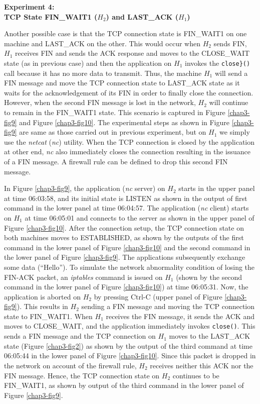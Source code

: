 \begin{multicols}{2}
\noindent
\textbf{Experiment 4:\\ TCP State FIN\_WAIT1 (\boldmath$H_{2}$) and LAST\_ACK ($H_{1}$)}
\smallskip

Another possible case is that the TCP connection state is FIN\_WAIT1 on one machine and LAST\_ACK on the other. This would occur when $H_{2}$ sends FIN, $H_{1}$ receives FIN and sends the ACK response and moves to the CLOSE\_WAIT state (as in previous case) and then the application on $H_{1}$ invokes the \lstinline|close}()| call because it has no more data to transmit. Thus, the machine $H_{1}$ will send a FIN message and move the TCP connection state to LAST\_ACK state as it waits for the acknowledgement of its FIN in order to finally close the connection. However, when the second FIN message is lost in the network, $H_{2}$ will continue to remain in the FIN\_WAIT1 state. This scenario is captured in Figure \ref{chap3-fig9} and Figure \ref{chap3-fig10}. The experimental steps as shown in Figure \ref{chap3-fig9} are same as those carried out in previous experiment, but on $H_{1}$ we simply use the \textit{netcat} (\textit{nc}) utility. When the TCP connection is closed by the application at other end, \textit{nc} also immediately closes the connection resulting in the issuance of a FIN message. A firewall rule can be defined to drop this second FIN message.

In Figure \ref{chap3-fig9}, the application (\textit{nc} server) on $H_{2}$ starts in the upper panel at time 06:03:58, and its initial state is LISTEN as shown in the output of first command in the lower panel at time 06:04:57. The application (\textit{nc} client) starts on $H_{1}$ at time 06:05:01 and connects to the server as shown in the upper panel of Figure \ref{chap3-fig10}. After the connection setup, the TCP connection state on both machines moves to ESTABLISHED, as shown by the outputs of the first command in the lower panel of Figure \ref{chap3-fig10} and the second command in the lower panel of Figure \ref{chap3-fig9}. The applications subsequently exchange some data (``Hello''). To simulate the network abnormality condition of losing the FIN-ACK packet, an \textit{iptables} command is issued on $H_{1}$ (shown by the second command in the lower panel of Figure \ref{chap3-fig10}) at time 06:05:31. Now, the application is aborted on $H_{2}$ by pressing Ctrl-C (upper panel of Figure \ref{chap3-fig9}). This results in $H_{2}$ sending a FIN message and moving the TCP connection state to FIN\_WAIT1. When $H_{1}$ receives the FIN message, it sends the ACK and moves to CLOSE\_WAIT, and the application immediately invokes \lstinline|close()|. This sends a FIN message and the TCP connection on $H_{1}$ moves to the LAST\_ACK state (Figure \ref{chap3-fig2}) as shown by the output of the third command at time 06:05:44 in the lower panel of Figure \ref{chap3-fig10}. Since this packet is dropped in the network on account of the firewall rule, $H_{2}$ receives neither this ACK nor the FIN message. Hence, the TCP connection state on $H_{2}$ continues to be FIN\_WAIT1, as shown by output of the third command in the lower panel of Figure \ref{chap3-fig9}.


\end{multicols}
